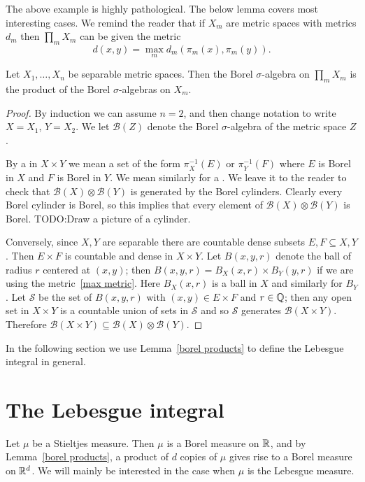 The above example is highly pathological.
The below lemma covers most interesting cases.
We remind the reader that if $X_{m}$ are metric spaces with metrics $d_{m}$ then $\prod_{m} X_{m}$ can be given the metric
\begin{equation}\label{max metric}
d(x, y) = \max_{m} d_{m}(\pi_{m}(x), \pi_{m}(y)).
\end{equation}

\begin{lemma}\label{borel products}
Let $X_{1}, \dots, X_{n}$ be separable metric spaces.
Then the Borel $\sigma$-algebra on $\prod_{m} X_{m}$ is the product of the Borel $\sigma$-algebras on $X_{m}$.
\end{lemma}
\begin{proof}
By induction we can assume $n = 2$, and then change notation to write $X = X_{1}$, $Y = X_{2}$. We let $\mathcal B(Z)$ denote the Borel $\sigma$-algebra of the metric space $Z$.

By a  in $X \times Y$ we mean a set of the form $\pi_{X}^{-1}(E)$ or $\pi_{Y}^{-1}(F)$ where $E$ is Borel in $X$ and $F$ is Borel in $Y$.
We mean similarly for a .
We leave it to the reader to check that $\mathcal B(X) \otimes \mathcal B(Y)$ is generated by the Borel cylinders.
Clearly every Borel cylinder is Borel, so this implies that every element of $\mathcal B(X) \otimes \mathcal B(Y)$ is Borel.
TODO:\@ Draw a picture of a cylinder.

Conversely, since $X, Y$ are separable there are countable dense subsets $E, F \subseteq X, Y$.
Then $E \times F$ is countable and dense in $X \times Y$.
Let $B(x, y, r)$ denote the ball of radius $r$ centered at $(x, y)$; then $B(x, y, r) = B_{X}(x, r) \times B_{Y}(y, r)$ if we are using the metric~\ref{max metric}. Here $B_{X}(x, r)$ is a ball in $X$ and similarly for $B_{Y}$.
Let $\mathcal S$ be the set of $B(x, y, r)$ with $(x, y) \in E \times F$ and $r \in \mathbb{Q}$; then any open set in $X \times Y$ is a countable union of sets in $\mathcal S$ and so $\mathcal S$ generates $\mathcal B(X \times Y)$.
Therefore $\mathcal B(X \times Y) \subseteq \mathcal B(X) \otimes \mathcal B(Y)$.
\end{proof}

In the following section we use Lemma~\ref{borel products} to define the Lebesgue integral in general.

\section{The Lebesgue integral}
Let $\mu$ be a Stieltjes measure.
Then $\mu$ is a Borel measure on $\mathbb{R}$, and by Lemma~\ref{borel products}, a product of $d$ copies of $\mu$ gives rise to a Borel measure on $\mathbb{R}^{d}$.
We will mainly be interested in the case when $\mu$ is the Lebesgue measure.

